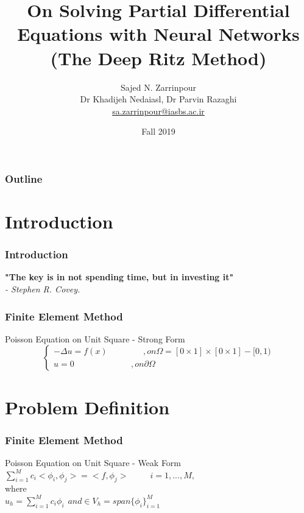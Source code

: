 \documentclass{beamer}
\title[On Solving PDEs with NN]{
  On Solving Partial Differential Equations with Neural Networks\\(The Deep Ritz Method)}
\author[Sajed N. Zarrinpour]{
  Sajed N. Zarrinpour \\\medskip
  {\small Dr Khadijeh Nedaiasl, Dr Parvin Razaghi} \\ 
  {\small \url{sa.zarrinpour@iasbs.ac.ir}}}
\institute[IASBS]{
  Institute for Advanced Studies in Basic Sciences}
\date[\today]{
  Fall 2019 }
\begin{document}
\begin{frame}
  \titlepage
\end{frame}

\begin{frame}
  \frametitle{Outline}

  \tableofcontents
\end{frame}

\section{Introduction}


\begin{frame}
	\frametitle{Introduction}

	\textbf{"The key is in not spending time, but in investing it"}\centering\\
	\em - Stephen R. Covey. 
	
\end{frame}

\begin{frame}
  \frametitle{Finite Element Method}

  \begin{block}{Poisson Equation on Unit Square - Strong Form}
    \begin{equation*}
    	\begin{cases}
    	 -\Delta u = f (x)\hspace{50pt} ,on \Omega = [0\times 1] \times [0\times 1] - [0, 1) 
    	 \\
    	 u = 0 \hspace{80pt} ,on \partial \Omega
    	\end{cases}	
    \end{equation*}
  \end{block}

\end{frame}

\section{Problem Definition}
\begin{frame}
	\frametitle{Finite Element Method}	
	\begin{block}{Poisson Equation on Unit Square - Weak Form}		
		$\sum_{i=1}^{M} c_i <\phi_i,\phi_j> = <f,\phi_j> \hspace{30pt} i=1,...,M,$		
		\\where\\	
		 $u_h = \sum_{i=1}^{M} c_i \phi_i \hspace{5pt} and \in V_h=span\{\phi_i\}_{i=1}^{M}$		
	\end{block}	
\end{frame}
\end{document}
